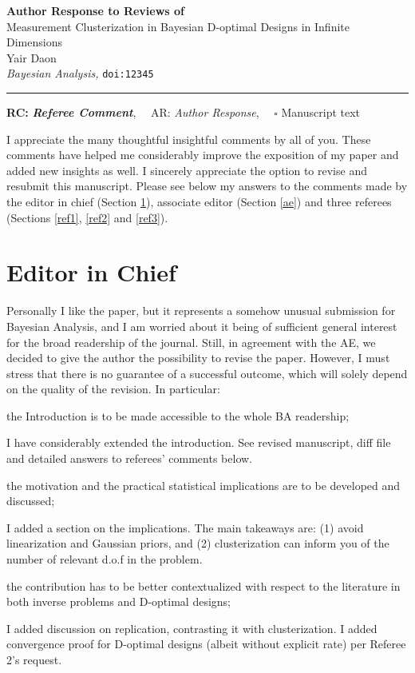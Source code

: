 \documentclass{article}
\def\papertitle{Measurement Clusterization in Bayesian D-optimal Designs in Infinite Dimensions}
\def\authors{Yair Daon}
\def\journal{Bayesian Analysis}
\def\doi{12345}
\providecommand{\lettertitle}{Author Response to Reviews of}
\providecommand{\papertitle}{Title}
\providecommand{\authors}{Authors}
\providecommand{\journal}{Journal}
\providecommand{\doi}{--}
\begin{document}
{\Large\bf \lettertitle}\\[1em]
{\huge \papertitle}\\[1em]
{\authors}\\
{\it \journal, }\texttt{doi:\doi}\\
\hrule

\hfill {\bfseries RC:} \textbf{\textit{Referee Comment}},\(\quad\) AR: \emph{Author Response}, \(\quad\square\) Manuscript text

I appreciate the many thoughtful insightful comments by all of
you. These comments have helped me considerably improve the exposition
of my paper and added new insights as well. I sincerely appreciate the
option to revise and resubmit this manuscript. Please see below my
answers to the comments made by the editor in chief (Section
\ref{eic}), associate editor (Section \ref{ae}) and three referees
(Sections \ref{ref1}, \ref{ref2} and \ref{ref3}).



\section{Editor in Chief}\label{eic}
\RC Personally I like the paper, but it represents a somehow unusual
submission for Bayesian Analysis, and I am worried about it being of
sufficient general interest for the broad readership of the
journal. Still, in agreement with the AE, we decided to give the
author the possibility to revise the paper. However, I must stress
that there is no guarantee of a successful outcome, which will solely
depend on the quality of the revision. In particular:

\RC the Introduction is to be made accessible to the whole BA
    readership;
    
\AR I have considerably extended the introduction. See revised
manuscript, diff file and detailed answers to referees' comments
below.
   
    
\RC the motivation and the practical statistical implications are to
be developed and discussed;

\AR I added a section on the implications. The main takeaways are: (1)
avoid linearization and Gaussian priors, and (2) clusterization can
inform you of the number of relevant d.o.f in the problem.
   
    
\RC the contribution has to be better contextualized with respect to
the literature in both inverse problems and D-optimal designs;

\AR I added discussion on replication, contrasting it with
clusterization. I added convergence proof for D-optimal designs
(albeit without explicit rate) per Referee 2's request.
    
\end{document}
